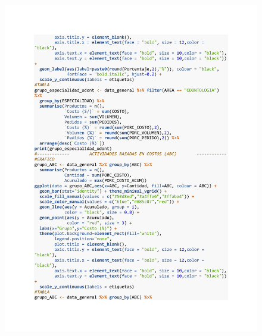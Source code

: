 \begin{figure}[h!]
        \begin{tcolorbox}[colback=white, colframe=black, boxrule=1.5pt, sharp corners=all]
            {\includegraphics[width=\linewidth, height=22cm, trim=2.5cm 2.75cm 2.5cm 2.5cm, clip]{images/script4.pdf}}
        \end{tcolorbox}
\end{figure}

